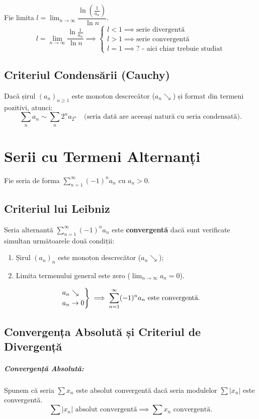\documentclass[12pt, a4paper]{report}
\begin{document}
	Fie limita $l = \lim_{n \to \infty} \dfrac{\ln \left( \frac{1}{a_n} \right)}{\ln n}$.
	\[
	l = \lim_{n \to \infty} \frac{\ln \frac{1}{a_n}}{\ln n} \implies 
	\begin{cases} 
		l < 1 \implies \text{serie divergentă} \\ 
		l > 1 \implies \text{serie convergentă} \\ 
		l = 1 \implies \text{? - aici chiar trebuie studiat}
	\end{cases}
	\]
	
	\section{Criteriul Condensării (Cauchy)}
	Dacă șirul $(a_n)_{n \ge 1}$ este monoton descrecător ($a_n \searrow$) și format din termeni pozitivi, atunci:
	\[
	\sum_{n} a_n \sim \sum_{n} 2^n a_{2^n} \quad \text{(seria dată are aceeași natură cu seria condensată).}
	\]
	
	
	\chapter{Serii cu Termeni Alternanți}
	
	Fie seria de forma $\sum_{n=1}^{\infty} (-1)^n a_n$ cu $a_n > 0$.
	
	\section{Criteriul lui Leibniz}
	Seria alternantă $\sum_{n=1}^{\infty} (-1)^n a_n$ este \textbf{convergentă} dacă sunt verificate simultan următoarele două condiții:
	\begin{enumerate}
		\item Șirul $(a_n)_n$ este monoton descrecător ($a_n \searrow$);
		\item Limita termenului general este zero ($\lim_{n \to \infty} a_n = 0$).
	\end{enumerate}
	\[
	\begin{rcases}
		a_n \searrow \\
		a_n \to 0
	\end{rcases}
	\implies \sum_{n=1}^{\infty} (-1)^n a_n \text{ este convergentă.}
	\]
	
	\section{Convergența Absolută și Criteriul de Divergență}
	
	\paragraph{Convergență Absolută:}
	Spunem că seria $\sum x_n$ este absolut convergentă dacă seria modulelor $\sum |x_n|$ este convergentă. 
	\[
	\sum |x_n| \text{ absolut convergentă} \implies \sum x_n \text{ convergentă.}
	\]
	
\end{document}
